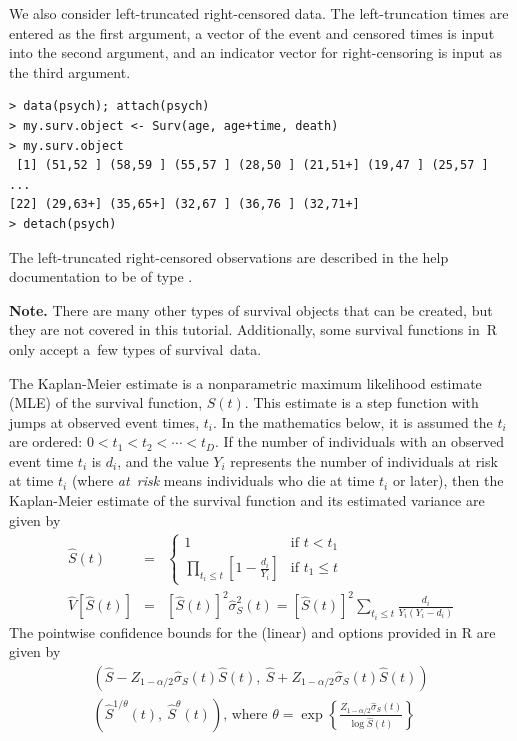 \documentclass[11pt]{article}
\newcommand{\R}[1]{\textsf{R}}
\begin{document}
We also consider left-truncated right-censored data. The left-truncation times are entered as the first argument, a vector of the event and censored times is input into the second argument, and an indicator vector for right-censoring is input as the third argument.
{\color{verbatimrcom}\begin{verbatim}
> data(psych); attach(psych)
> my.surv.object <- Surv(age, age+time, death)
> my.surv.object
 [1] (51,52 ] (58,59 ] (55,57 ] (28,50 ] (21,51+] (19,47 ] (25,57 ]
...
[22] (29,63+] (35,65+] (32,67 ] (36,76 ] (32,71+]
> detach(psych)
\end{verbatim}}
The left-truncated right-censored observations are described in the  help documentation to be of type .

\textbf{Note.} There are many other types of survival objects that can be created, but they are not covered in this tutorial. Additionally, some survival functions in~\R{} only accept a~few types of survival~data.

\pagebreak



{}\vspace{-1mm}\par
{}
\label{kapMeiEstimateAndBounds}

The Kaplan-Meier estimate is a nonparametric maximum likelihood estimate (MLE) of the survival function, $S(t)$. This estimate is a step function with jumps at observed event times, $t_i$. In the mathematics below, it is assumed the $t_i$ are ordered: $0 < t_1 < t_2 <  \cdots < t_D$. If the number of individuals with an observed event time $t_i$ is $d_i$, and the value $Y_i$ represents the number of individuals at risk at time $t_i$ (where \emph{at~risk} means individuals who die at time $t_i$ or later), then the Kaplan-Meier estimate of the survival function and its estimated variance are given by
\begin{eqnarray*}
\hat{S}(t) &=& \left\{\begin{array}{cl}1 & \text{if }t < t_1 \\ \prod_{t_i \leq t}\left[ 1- \frac{d_i}{Y_i} \right] &\text{if }t_1 \leq t \end{array}\right.  \\
\widehat{V}[\hat{S}(t)] &=& \left[ \hat{S}(t) \right]^2 \hat{\sigma}_S^2(t) = \left[ \hat{S}(t) \right]^2 \sum_{t_i \leq t} \frac{d_i}{Y_i(Y_i-d_i)}
\end{eqnarray*}
The pointwise confidence bounds for the  (linear) and  options provided in \R{} are given by
\begin{eqnarray*}
\left( \hat{S} - Z_{1-\alpha/2}\hat{\sigma}_S(t)\hat{S}(t), \ \hat{S} + Z_{1-\alpha/2}\hat{\sigma}_S(t)\hat{S}(t) \right) \\
\left(\hat{S}^{1/\theta}(t), \ \hat{S}^\theta(t)\right)\text{, where }\theta = \exp\left\{ \frac{Z_{1-\alpha/2}\hat{\sigma}_S(t)}{\log \hat{S}(t) } \right\}
\end{eqnarray*}
\end{document}
